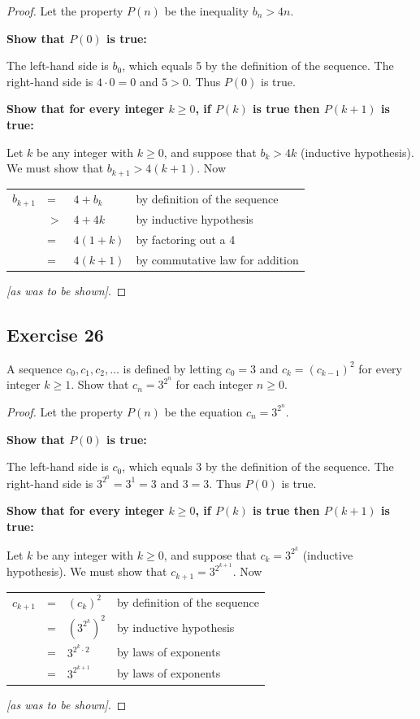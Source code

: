 \documentclass[14pt]{extarticle}
\newcommand{\dps}{\displaystyle}
\newcommand{\cy}{\color{cyan}}
\begin{document}
\begin{proof}
Let the property $P(n)$ be the inequality $b_n > 4n$. 

{\bf Show that $P(0)$ is true:} 

The left-hand side is $b_0$, which equals 5 by the definition of the sequence. The right-hand side is $4 \cdot 0 = 0$ and $5 > 0$. Thus $P(0)$ is true. 

{\bf Show that for every integer $k \geq 0$, if $P(k)$ is true then $P(k + 1)$ is true:} 

Let $k$ be any integer with $k \geq 0$, and suppose that $b_k > 4k$ ({\cy inductive hypothesis}). We must show that $b_{k + 1} > 4(k+1)$. Now

\begin{center}
\begin{tabular}{rlll}
$b_{k+1}$ & = & $4 + b_k$ & {\cy by definition of the sequence} \\
& $>$ & $4 + 4k$ & {\cy by inductive hypothesis} \\
& = & $4(1 + k)$ & {\cy by factoring out a 4} \\
& = & $4(k + 1)$ & {\cy by commutative law for addition}
\end{tabular}
\end{center}

{\it [as was to be shown]}.
\end{proof}

\subsection{Exercise 26}
A sequence $c_0, c_1, c_2, \ldots$ is defined by letting
$c_0 = 3$ and $c_k = (c_{k-1})^2$ for every integer $k \geq 1$. Show that $\dps c_n = 3^{2^n}$ for each integer $n \geq 0$.

\begin{proof}
Let the property $P(n)$ be the equation $\dps c_n = 3^{2^n}$. 

{\bf Show that $P(0)$ is true:} 

The left-hand side is $c_0$, which equals 3 by the definition of the sequence. The right-hand side is $\dps 3^{2^0} = 3^1 = 3$ and $3 = 3$. Thus $P(0)$ is true. 

{\bf Show that for every integer $k \geq 0$, if $P(k)$ is true then $P(k + 1)$ is true:} 

Let $k$ be any integer with $k \geq 0$, and suppose that $\dps c_k = 3^{2^k}$ ({\cy inductive hypothesis}). We must show that $c_{k + 1} = 3^{2^{k+1}}$. Now

\begin{center}
\begin{tabular}{rlll}
$c_{k+1}$ & = & $(c_k)^2$ & {\cy by definition of the sequence} \\
& = & $\dps (3^{2^k})^2$ & {\cy by inductive hypothesis} \\
& = & $3^{2^k \cdot 2}$ & {\cy by laws of exponents} \\
& = & $3^{2^{k + 1}}$ & {\cy by laws of exponents}
\end{tabular}
\end{center}

{\it [as was to be shown]}.
\end{proof}
\end{document}
